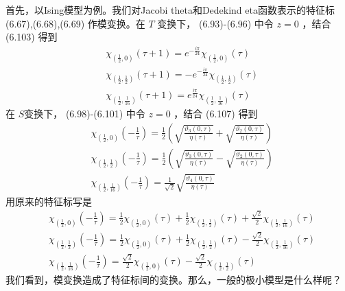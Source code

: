 首先，以Ising模型为例。我们对Jacobi theta和Dedekind eta函数表示的特征标 (6.67),(6.68),(6.69) 作模变换。在 $T$ 变换下， (6.93)-(6.96) 中令 $z=0$ ，结合 (6.103) 得到
\begin{align} &\chi_{\left(\frac{1}{2}, 0\right)}(\tau+1)=e^{-\frac{i \pi}{24}} \chi_{\left(\frac{1}{2}, 0\right)}(\tau)\\ &\chi_{\left(\frac{1}{2}, \frac{1}{2}\right)}(\tau+1)=-e^{-\frac{i \pi}{24}} \chi_{\left(\frac{1}{2}, \frac{1}{2}\right)}(\tau) \\ & \chi_{\left(\frac{1}{2}, \frac{1}{16}\right)}(\tau+1)=e^{\frac{i \pi}{24}} \chi_{\left(\frac{1}{2}, \frac{1}{16}\right)}(\tau)  \end{align}
在 $S $变换下， (6.98)-(6.101) 中令 $z=0$ ，结合 (6.107) 得到
\begin{align} &\chi_{\left(\frac{1}{2}, 0\right)}\left(-\frac{1}{\tau}\right)=\frac{1}{2}\left(\sqrt{\frac{\vartheta_{3}(0, \tau)}{\eta(\tau)}}+\sqrt{\frac{\vartheta_{2}(0, \tau)}{\eta(\tau)}}\right) \\ &\chi_{\left(\frac{1}{2}, \frac{1}{2}\right)}\left(-\frac{1}{\tau}\right)=\frac{1}{2}\left(\sqrt{\frac{\vartheta_{3}(0, \tau)}{\eta(\tau)}}-\sqrt{\frac{\vartheta_{2}(0, \tau)}{\eta(\tau)}}\right)\\ &\chi_{\left(\frac{1}{2}, \frac{1}{16}\right)}\left(-\frac{1}{\tau}\right)=\frac{1}{\sqrt{2}} \sqrt{\frac{\vartheta_{4}(0, \tau)}{\eta(\tau)}} \end{align}
用原来的特征标写是
\begin{equation}
	\begin{aligned} &\chi_{\left(\frac{1}{2}, 0\right)}\left(-\frac{1}{\tau}\right)=\frac{1}{2} \chi_{\left(\frac{1}{2}, 0\right)}(\tau)+\frac{1}{2} \chi_{\left(\frac{1}{2}, \frac{1}{2}\right)}(\tau)+\frac{\sqrt{2}}{2} \chi_{\left(\frac{1}{2}, \frac{1}{16}\right)}(\tau)\\ &\chi_{\left(\frac{1}{2}, \frac{1}{2}\right)}\left(-\frac{1}{\tau}\right)=\frac{1}{2} \chi_{\left(\frac{1}{2}, 0\right)}(\tau)+\frac{1}{2} \chi_{\left(\frac{1}{2}, \frac{1}{2}\right)}(\tau)-\frac{\sqrt{2}}{2} \chi_{\left(\frac{1}{2}, \frac{1}{16}\right)}(\tau) \\ &\chi_{\left(\frac{1}{2}, \frac{1}{16}\right)}\left(-\frac{1}{\tau}\right)=\frac{\sqrt{2}}{2} \chi_{\left(\frac{1}{2}, 0\right)}(\tau)-\frac{\sqrt{2}}{2} \chi_{\left(\frac{1}{2}, \frac{1}{2}\right)}(\tau) \end{aligned}
\end{equation}
我们看到，模变换造成了特征标间的变换。那么，一般的极小模型是什么样呢？

